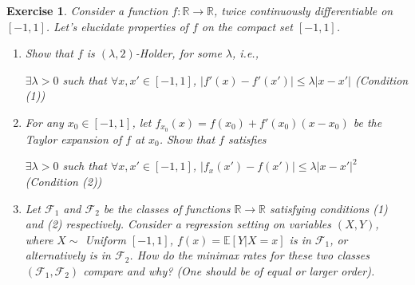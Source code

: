 \documentclass[12pt]{article}
\theoremstyle{colon}
\newtheorem{exercise}{Exercise}
\begin{document}
\begin{exercise}
  Consider a function $f: \mathbb{R} \rightarrow \mathbb{R}$, twice continuously differentiable on $[-1,1]$. Let's elucidate properties of $f$ on the compact set $[-1,1]$.

  \begin{enumerate}[label=\arabic*)]
    \item Show that $f$ is $(\lambda, 2)$-Holder, for some $\lambda$, i.e.,
      \begin{center}
        $\exists \lambda > 0$ such that $\forall x, x' \in [-1,1]$, $\lvert f'(x) - f'(x') \rvert \leq \lambda \lvert x - x' \rvert$ (Condition (1))
      \end{center}
    \item For any $x_0 \in [-1,1]$, let $f_{x_0}(x) = f(x_0) + f'(x_0)(x-x_0)$ be the Taylor expansion of $f$ at $x_0$. Show that $f$ satisfies
      \begin{center}
        $\exists \lambda > 0$ such that $\forall x, x' \in [-1,1]$, $\lvert f_x(x') - f(x') \rvert \leq \lambda \lvert x - x' \rvert^2$ (Condition (2))
      \end{center}
    \item Let $\mathcal{F}_1$ and $\mathcal{F}_2$ be the classes of functions $\mathbb{R} \rightarrow \mathbb{R}$ satisfying conditions (1) and (2) respectively. Consider a regression setting on variables $(X,Y)$, where $X \sim$ Uniform $[-1,1]$, $f(x) = \mathbb{E}[Y | X = x]$ is in $\mathcal{F}_1$, or alternatively is in $\mathcal{F}_2$. How do the minimax rates for these two classes $(\mathcal{F}_1, \mathcal{F}_2)$ compare and why? (One should be of equal or larger order).
  \end{enumerate}
\end{exercise}
\end{document}

